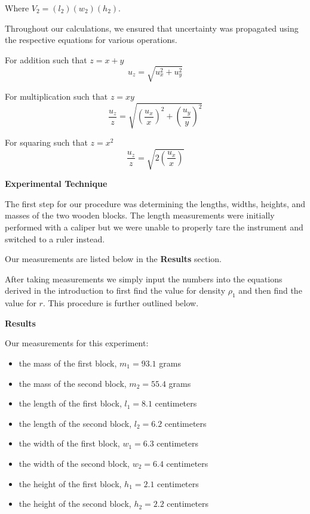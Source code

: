 \documentclass[12pt]{article}
\begin{document}
Where $V_2 = (l_2) (w_2) (h_2)$.

\newpage

Throughout our calculations, we ensured that uncertainty was propagated using the
respective equations for various operations.

\vspace{1em}

For addition such that $z = x + y$
\[ u_z = \sqrt{ u_x^{2} + u_y^{2} } \]

For multiplication such that $z = xy$
\[ \frac{u_z}{z} = \sqrt{ (\frac{u_x}{x})^{2} + (\frac{u_y}{y})^{2} } \]

For squaring such that $z = x^{2}$
\[ \frac{u_z}{z} = \sqrt{ 2(\frac{u_x}{x}) } \]

\vspace{1em}

\textbf{Experimental Technique}\vspace{1em}

The first step for our procedure was determining the lengths, widths, heights, and masses of the
two wooden blocks. The length measurements were initially performed with a caliper but we were unable to
properly tare the instrument and switched to a ruler instead.
 
Our measurements are listed below in the \textbf{Results} section.

\vspace{1em}

After taking measurements we simply input the numbers into the equations derived in the
introduction to first find the value for density $\rho_1$ and then find the value for $r$.
This procedure is further outlined below.

\newpage

\textbf{Results}\vspace{1em}

Our measurements for this experiment:
\begin{itemize}
    \item the mass of the first block, $m_1 = 93.1$ grams
    \item the mass of the second block, $m_2 = 55.4$ grams
    \item the length of the first block, $l_1 = 8.1$ centimeters
    \item the length of the second block, $l_2 = 6.2$ centimeters
    \item the width of the first block, $w_1 = 6.3$ centimeters
    \item the width of the second block, $w_2 = 6.4$ centimeters
    \item the height of the first block, $h_1 = 2.1$ centimeters
    \item the height of the second block, $h_2 = 2.2$ centimeters
\end{itemize}
\end{document}
